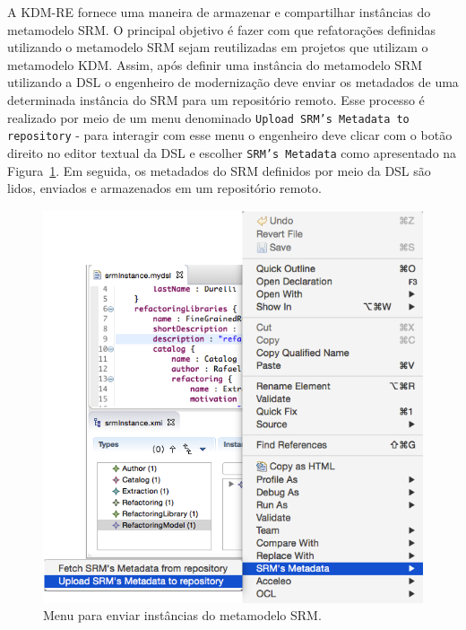 
A KDM-RE fornece uma maneira de armazenar e compartilhar instâncias do metamodelo SRM. O principal objetivo é fazer com que refatorações definidas utilizando o metamodelo SRM sejam reutilizadas em projetos que utilizam o metamodelo KDM. Assim, após definir uma instância do metamodelo SRM utilizando a DSL o engenheiro de modernização deve enviar os metadados de uma determinada instância do SRM para um repositório remoto. Esse processo é realizado por meio de um menu denominado \texttt{Upload SRM's Metadata to repository} - para interagir com esse menu o engenheiro deve clicar com o botão direito no editor textual da DSL e escolher \texttt{SRM's Metadata} como apresentado na Figura~\ref{fig:editor_SRM_metamodel_ECORE_menu}. Em seguida, os metadados do SRM definidos por meio da DSL são lidos, enviados e armazenados em um repositório remoto. 

\begin{figure}[!h]
	\centering
	\caption{Menu para enviar instâncias do metamodelo SRM.}
	\label{fig:editor_SRM_metamodel_ECORE_menu}
	\includegraphics[scale=0.7]{images/SRM_Upload_Image}
	\fautor
\end{figure}

